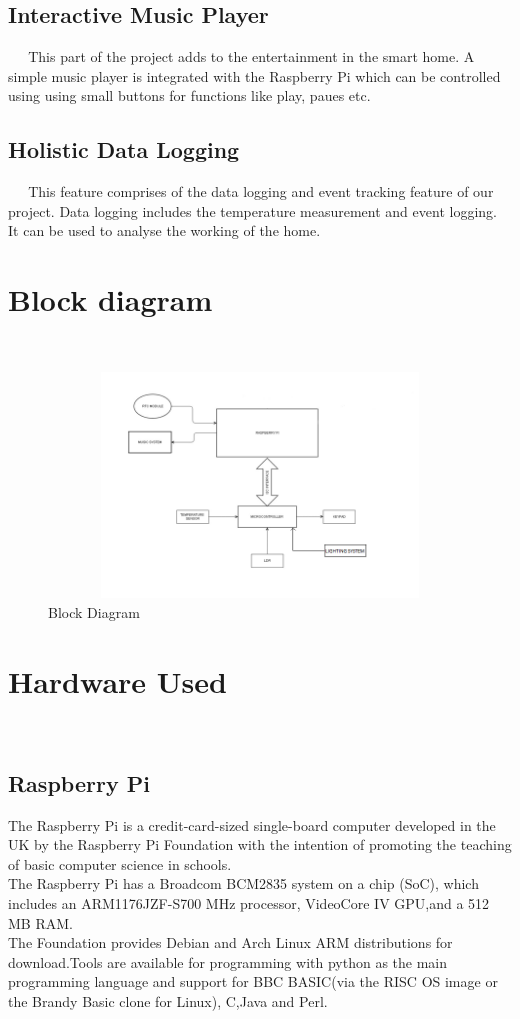 \documentclass[12pt,a4paper,oneside]{report}
\begin{document}
\begin{onehalfspacing}
\subsection{Interactive Music Player}
{$\;\;\;\;$}
This part of the project adds to the entertainment in the smart home. A simple music player is integrated with the Raspberry Pi which can be controlled using using small buttons for functions like play, paues etc.

\subsection{Holistic Data Logging}
{$\;\;\;\;$}
This feature comprises of the data logging and event tracking feature of our project. Data logging includes the temperature measurement and event logging. It can be used to analyse the working of the home.

\newpage
\section{Block diagram}
{$\;\;\;\;$}
\begin{figure}[h]
\includegraphics[width=15cm, height=6cm]{feasibilityreport.png}
\centering
\caption{Block Diagram}
\label{fig1}
\end{figure}



\section{Hardware Used}
{$\;\;\;\;$}
\subsection{Raspberry Pi}
The Raspberry Pi is a credit-card-sized single-board computer developed in the UK by the Raspberry Pi Foundation with the intention of promoting the teaching of basic computer science in schools.
\\The Raspberry Pi has a Broadcom BCM2835 system on a chip (SoC), which includes an ARM1176JZF-S700 MHz processor, VideoCore IV GPU,and a 512 MB RAM.\\
The Foundation provides Debian and Arch Linux ARM distributions for download.Tools are available for programming with python as the main programming language and support for BBC BASIC(via the RISC OS image or the Brandy Basic clone for Linux), C,Java and Perl.



\end{onehalfspacing}
\end{document}
